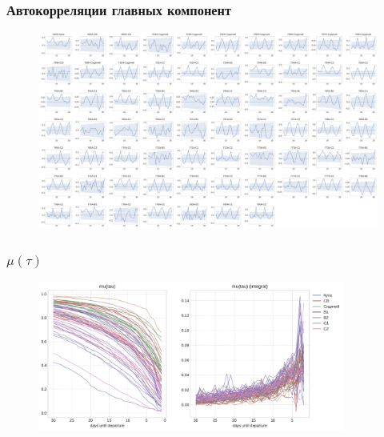 \documentclass[11pt,aspectratio=169]{beamer}
\begin{document}
\begin{frame}
    \frametitle{Автокорреляции главных компонент}

    \begin{figure}
        \centering
        \includegraphics[height=0.92\textheight]{../data/figures/pcs_acf.pdf}
    \end{figure}

\end{frame}


\begin{frame}
    \frametitle{$\mu(\tau)$}

    \begin{figure}
        \centering
        \includegraphics[width=0.9\textwidth]{../data/figures/means.pdf}
    \end{figure}

\end{frame}
\end{document}
